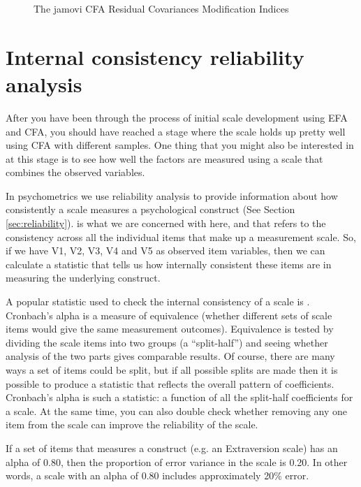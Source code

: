 \begin{figure}[p]
\begin{center}
\caption{The jamovi CFA Residual Covariances Modification Indices}
\label{fig:MTMM9}
\HR
\end{center}
\end{figure}


\section{Internal consistency reliability analysis~\label{sec:rel}}

After you have been through the process of initial scale development using EFA and CFA, you should have reached a stage where the scale holds up pretty well using CFA with different samples. One thing that you might also be interested in at this stage is to see how well the factors are measured using a scale that combines the observed variables. 

In psychometrics we use reliability analysis to provide information about how consistently a scale measures a psychological construct (See Section \ref{sec:reliability}).  is what we are concerned with here, and that refers to the consistency across all the individual items that make up a measurement scale. So, if we have V1, V2, V3, V4 and V5 as observed item variables, then we can calculate a statistic that tells us how internally consistent these items are in measuring the underlying construct.

A popular statistic used to check the internal consistency of a scale is \parencite{Cronbach1951}. Cronbach’s alpha is a measure of equivalence (whether different sets of scale items would give the same measurement outcomes). Equivalence is tested by dividing the scale items into two groups (a “split-half”) and seeing whether analysis of the two parts gives comparable results. Of course, there are many ways a set of items could be split, but if all possible splits are made then it is possible to produce a statistic that reflects the overall pattern of coefficients. Cronbach’s alpha is such a statistic: a function of all the split-half coefficients for a scale. At the same time, you can also double check whether removing any one item from the scale can improve the reliability of the scale. 

If a set of items that measures a construct (e.g. an Extraversion scale) has an alpha of 0.80, then the proportion of error variance in the scale is 0.20. In other words, a scale with an alpha of 0.80 includes approximately 20\% error.


